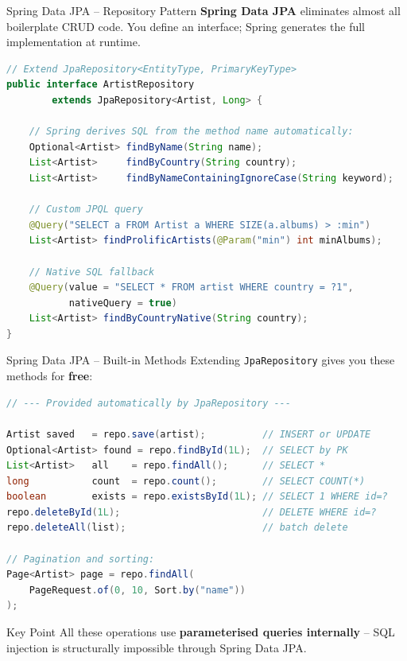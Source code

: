 \begin{frame}[fragile]{Spring Data JPA -- Repository Pattern}
  \textbf{Spring Data JPA} eliminates almost all boilerplate CRUD code.
  You define an interface; Spring generates the full implementation at runtime.

  \begin{lstlisting}[style=sqlstyle, language=Java]
// Extend JpaRepository<EntityType, PrimaryKeyType>
public interface ArtistRepository
        extends JpaRepository<Artist, Long> {

    // Spring derives SQL from the method name automatically:
    Optional<Artist> findByName(String name);
    List<Artist>     findByCountry(String country);
    List<Artist>     findByNameContainingIgnoreCase(String keyword);

    // Custom JPQL query
    @Query("SELECT a FROM Artist a WHERE SIZE(a.albums) > :min")
    List<Artist> findProlificArtists(@Param("min") int minAlbums);

    // Native SQL fallback
    @Query(value = "SELECT * FROM artist WHERE country = ?1",
           nativeQuery = true)
    List<Artist> findByCountryNative(String country);
}
  \end{lstlisting}
\end{frame}

\begin{frame}[fragile]{Spring Data JPA -- Built-in Methods}
  Extending \texttt{JpaRepository} gives you these methods for \textbf{free}:

  \begin{lstlisting}[style=sqlstyle, language=Java]
// --- Provided automatically by JpaRepository ---

Artist saved   = repo.save(artist);          // INSERT or UPDATE
Optional<Artist> found = repo.findById(1L);  // SELECT by PK
List<Artist>   all    = repo.findAll();      // SELECT *
long           count  = repo.count();        // SELECT COUNT(*)
boolean        exists = repo.existsById(1L); // SELECT 1 WHERE id=?
repo.deleteById(1L);                         // DELETE WHERE id=?
repo.deleteAll(list);                        // batch delete

// Pagination and sorting:
Page<Artist> page = repo.findAll(
    PageRequest.of(0, 10, Sort.by("name"))
);
  \end{lstlisting}

  \begin{block}{Key Point}
    All these operations use \textbf{parameterised queries internally} -- SQL injection
    is structurally impossible through Spring Data JPA.
  \end{block}
\end{frame}

